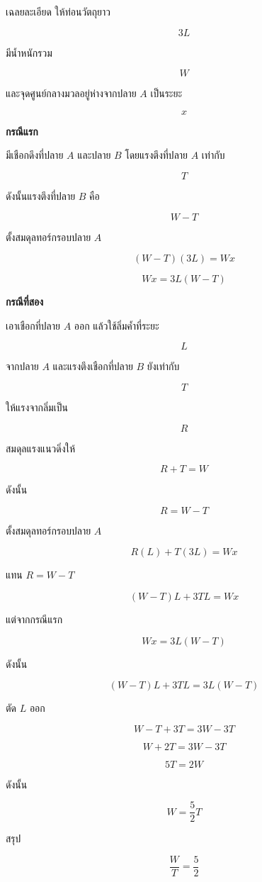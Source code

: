 \begin{examplebox}{เฉลยละเอียด}
ให้ท่อนวัตถุยาว

\[
3L
\]

มีน้ำหนักรวม

\[
W
\]

และจุดศูนย์กลางมวลอยู่ห่างจากปลาย $A$ เป็นระยะ

\[
x
\]

\textbf{กรณีแรก}

มีเชือกดึงที่ปลาย $A$ และปลาย $B$ โดยแรงตึงที่ปลาย $A$ เท่ากับ

\[
T
\]

ดังนั้นแรงตึงที่ปลาย $B$ คือ

\[
W-T
\]

ตั้งสมดุลทอร์กรอบปลาย $A$

\[
(W-T)(3L)=Wx
\]

\[
Wx=3L(W-T)
\]

\textbf{กรณีที่สอง}

เอาเชือกที่ปลาย $A$ ออก แล้วใช้ลิ่มค้ำที่ระยะ

\[
L
\]

จากปลาย $A$ และแรงตึงเชือกที่ปลาย $B$ ยังเท่ากับ

\[
T
\]

ให้แรงจากลิ่มเป็น

\[
R
\]

สมดุลแรงแนวดิ่งให้

\[
R+T=W
\]

ดังนั้น

\[
R=W-T
\]

ตั้งสมดุลทอร์กรอบปลาย $A$

\[
R(L)+T(3L)=Wx
\]

แทน $R=W-T$

\[
(W-T)L+3TL=Wx
\]

แต่จากกรณีแรก

\[
Wx=3L(W-T)
\]

ดังนั้น

\[
(W-T)L+3TL=3L(W-T)
\]

ตัด $L$ ออก

\[
W-T+3T=3W-3T
\]

\[
W+2T=3W-3T
\]

\[
5T=2W
\]

ดังนั้น

\[
W=\frac{5}{2}T
\]

สรุป

\[
\boxed{\frac{W}{T}=\frac{5}{2}}
\]
\end{examplebox}

